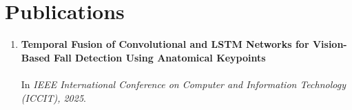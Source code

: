 \section{Publications}

\begin{enumerate}

    \item \textbf{Temporal Fusion of Convolutional and LSTM Networks for Vision-Based Fall Detection Using Anatomical Keypoints}\\\\
    
    In \textit{IEEE International Conference on Computer and Information Technology (ICCIT), 2025}.

\end{enumerate}

\endinput